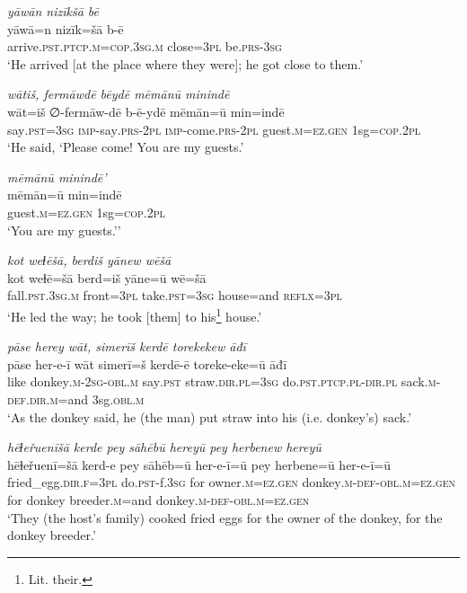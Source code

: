 \ea \label{HB.50}
\textit{yāwān nizīkšā bē} \\ 
\gll yāwā=n nizīk=šā b-ē \\ 
 arrive\textsc{.pst}\textsc{.ptcp}\textsc{.m}\textsc{=cop}\textsc{.3sg}\textsc{.m} close\textsc{=3pl} be\textsc{.prs}\textsc{-3sg} \\ 
\glt `He arrived [at the place where they were]; he got close to them.'
\z 
 
\ea \label{HB.51}
\textit{wātiš, fermāwdē bēydē mēmānū minindē} \\ 
\gll wāt=iš ∅-fermāw-dē b-ē-ydē mēmān=ū min=indē \\ 
 say\textsc{.pst}\textsc{=3sg} \textsc{imp-}say\textsc{.prs}\textsc{-2pl} \textsc{imp-}come\textsc{.prs}\textsc{-2pl} guest\textsc{.m}\textsc{=ez}\textsc{.gen} 1sg\textsc{=cop}\textsc{.2pl} \\ 
\glt `He said, ‘Please come! You are my guests.'
\z 
 
\ea \label{HB.52}
\textit{mēmānū minindē'} \\ 
\gll mēmān=ū min=indē \\ 
 guest\textsc{.m}\textsc{=ez}\textsc{.gen} 1sg\textsc{=cop}\textsc{.2pl} \\ 
\glt `You are my guests.’'
\z 
 
\ea \label{HB.53}
\textit{kot weɫēšā, berdiš yānew wēšā} \\ 
\gll kot weɫē=šā berd=iš yāne=ū wē=šā \\ 
 fall\textsc{.pst}\textsc{.3sg}\textsc{.m} front\textsc{=3pl} take\textsc{.pst}\textsc{=3sg} house=and \textsc{reflx}\textsc{=3pl} \\ 
\glt `He led the way; he took [them] to his\footnote{Lit. their.} house.'
\z 
 
\ea \label{HB.54}
\textit{pāse herey wāt, simerīš kerdē torekekew āđī} \\ 
\gll pāse her-e-ī wāt simerī=š kerdē-ē toreke-eke=ū āđī \\ 
 like donkey\textsc{.m}-\textsc{2sg}\textsc{-obl}\textsc{.m} say\textsc{.pst} straw\textsc{.dir}\textsc{.pl}\textsc{=3sg} do\textsc{.pst}\textsc{.ptcp}\textsc{.pl}\textsc{-dir}\textsc{.pl} sack\textsc{.m}\textsc{-def}\textsc{.dir}\textsc{.m}=and 3sg\textsc{.obl}\textsc{.m} \\ 
\glt `As the donkey said, he (the man) put straw into his (i.e. donkey’s) sack.'
\z 
 
\ea \label{HB.56}
\textit{hēɫeřuenīšā kerde pey sāhēbū hereyū pey herbenew hereyū} \\ 
\gll hēɫeřuenī=šā kerd-e pey sāhēb=ū her-e-ī=ū pey herbene=ū her-e-ī=ū \\ 
 fried\_egg\textsc{.dir}\textsc{\textsc{.f}}\textsc{=3pl} do\textsc{.pst}-f\textsc{.3sg} for owner\textsc{.m}\textsc{=ez}\textsc{.gen} donkey\textsc{.m}\textsc{-def}\textsc{-obl}\textsc{.m}\textsc{=ez}\textsc{.gen} for donkey breeder\textsc{.m}=and donkey\textsc{.m}\textsc{-def}\textsc{-obl}\textsc{.m}\textsc{=ez}\textsc{.gen} \\ 
\glt `They (the host’s family) cooked fried eggs for the owner of the donkey, for the donkey breeder.'
\z 
 
